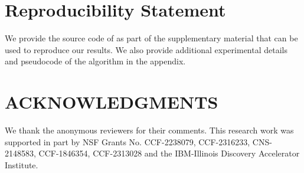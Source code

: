\documentclass{article}
\begin{document}
\newpage 

{
\section{Reproducibility Statement} We provide the source code of \Tool{} as part of the supplementary material that can be used to reproduce our results. We also provide additional experimental details and pseudocode of the algorithm in the appendix.

}
{
}


\section*{ACKNOWLEDGMENTS}
We thank the anonymous reviewers for their comments. This research work was supported in part by NSF Grants No. CCF-2238079, CCF-2316233, CNS-2148583, CCF-1846354, CCF-2313028 and the IBM-Illinois Discovery Accelerator Institute.




\appendix

\newpage


\end{document}
